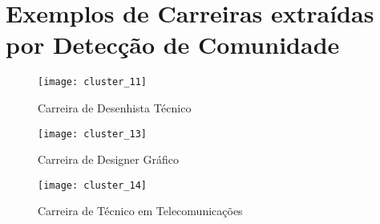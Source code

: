 \documentclass[10pt,a4paper,final]{article}
\begin{document}
\newpage

\appendix

\section{Exemplos de Carreiras extraídas por Detecção de Comunidade} \label{apx:exemplo-de-carreiras}

\vspace{2\baselineskip}

\begin{figure}[h]
  \centering
  \texttt{[image: cluster\_11]}
  \caption{Carreira de Desenhista Técnico}
\end{figure}

\begin{figure}[h]
  \centering
  \texttt{[image: cluster\_13]}
  \caption{Carreira de Designer Gráfico}
\end{figure}

\begin{figure}[h]
  \centering
  \texttt{[image: cluster\_14]}
  \caption{Carreira de Técnico em Telecomunicações}
\end{figure}
\end{document}
